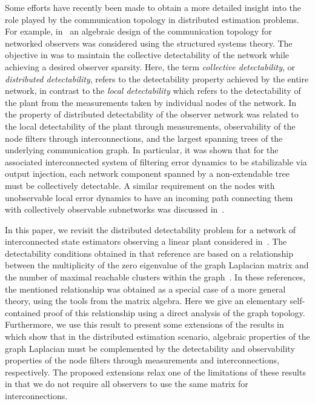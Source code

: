 \documentclass[a4paper,10pt,conference]{ieeeconf}
\begin{document}
Some efforts have recently been made to obtain
a more detailed insight into the role played by the communication topology
in distributed estimation problems. For example, in~\cite{DK-2013} an
algebraic design of the communication topology for networked observers was
considered using the structured systems theory. The objective in
\cite{EM-2013} was to maintain
the collective detectability of the network while achieving a desired
observer sparsity. Here, the term \emph{collective detectability}, or
\emph{distributed detectability}, refers to the detectability property
achieved by the entire network, in contrast to the \emph{local
  detectability} which refers to the detectability of the plant from the
measurements taken by individual nodes of the network. In~\cite{U7b-journal} the
property of distributed detectability of the observer network was related
to the local detectability of the plant through measurements, observability of
the node filters through interconnections, and the largest spanning trees of the
underlying communication graph. In particular, it was shown that for the
associated interconnected system of filtering error dynamics to be
stabilizable via output injection, each network component spanned by a
non-extendable tree must be collectively detectable. A similar requirement
on the nodes with unobservable local error dynamics to have an 
incoming path connecting them with collectively observable subnetworks
was discussed in~\cite{FFS-2010}.  



In this paper, we revisit the distributed detectability problem for a
network of interconnected state estimators observing a linear plant
considered in~\cite{U7b-journal}. The detectability conditions
obtained in that reference are based on a relationship between the
multiplicity of the zero eigenvalue of the graph Laplacian matrix and the
number of maximal reachable clusters within the
graph~\cite{AC-2005,CV-2006}. In these references, the mentioned
relationship was obtained as a special case of a more general
theory, using the tools from the matrix algebra. Here we give an elementary
self-contained proof of this relationship using a direct analysis of the
graph topology. Furthermore, we use this result to present some extensions
of the results in~\cite{U7b-journal} which show that in 
the distributed estimation scenario, algebraic properties of the graph
Laplacian must be complemented by the detectability and observability
properties of the node filters through measurements and interconnections,
respectively. The proposed extensions relax one of the limitations of these
results in that we do not require all observers to use the
same matrix for interconnections.  
\end{document}
